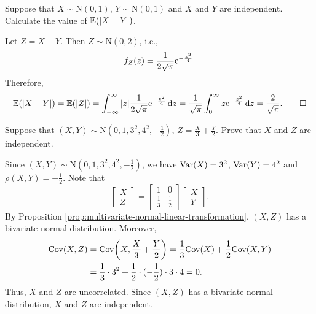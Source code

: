 \begin{example}
  Suppose that \(X \sim \mathrm{N}(0, 1)\), \(Y \sim \mathrm{N}(0, 1)\) and \(X\) and \(Y\) are independent. Calculate the value of \(\mathbb{E}(|X - Y|)\).
\end{example}
\begin{solution}
  Let \(Z = X - Y\). Then \(Z \sim \mathrm{N}(0, 2)\), i.e.,
  \[
    f_Z(z) = \frac{1}{2\sqrt{\mathrm{\pi}}} \mathrm{e}^{-\frac{z^2}{4}}.
  \]
  Therefore,
  \[
    \mathbb{E}(|X - Y|) = \mathbb{E}(|Z|) = \int_{-\infty}^\infty |z| \frac{1}{2\sqrt{\mathrm{\pi}}} \mathrm{e}^{-\frac{z^2}{4}} \, \mathrm{d} z = \frac{1}{\sqrt{\mathrm{\pi}}} \int_0^\infty z \mathrm{e}^{-\frac{z^2}{4}} \, \mathrm{d} z = \frac{2}{\sqrt{\mathrm{\pi}}}. \qedhere
  \]
\end{solution}

\begin{example}
  Suppose that \((X, Y) \sim \mathrm{N}(0, 1, 3^2, 4^2, -\frac{1}{2})\), \(Z = \frac{X}{3} + \frac{Y}{2}\). Prove that \(X\) and \(Z\) are independent.
\end{example}
\begin{solution}
  Since \((X, Y) \sim \mathrm{N}(0, 1, 3^2, 4^2, -\frac{1}{2})\), we have \(\mathrm{Var}(X) = 3^2\), \(\mathrm{Var}(Y) = 4^2\) and \(\rho(X, Y) = -\frac{1}{2}\). Note that
  \[
    \begin{bmatrix}
      X \\
      Z
    \end{bmatrix} = \begin{bmatrix}
      1 & 0 \\
      \frac{1}{3} & \frac{1}{2}
    \end{bmatrix} \begin{bmatrix}
      X \\
      Y
    \end{bmatrix}.
  \]
  By Proposition \ref{prop:multivariate-normal-linear-transformation}, \((X, Z)\) has a bivariate normal distribution. Moreover,
  \begin{align*}
    \mathrm{Cov}(X, Z) &= \mathrm{Cov}\!\left(X, \frac{X}{3} + \frac{Y}{2}\right) = \frac{1}{3} \mathrm{Cov}(X) + \frac{1}{2} \mathrm{Cov}(X, Y) \\
    &= \frac{1}{3} \cdot 3^2 + \frac{1}{2} \cdot (-\frac{1}{2}) \cdot 3 \cdot 4 = 0.
  \end{align*}
  Thus, \(X\) and \(Z\) are uncorrelated. Since \((X, Z)\) has a bivariate normal distribution, \(X\) and \(Z\) are independent. \qedhere
\end{solution}